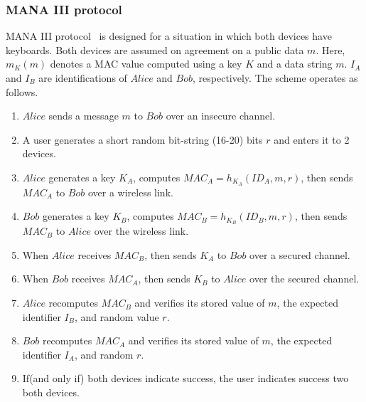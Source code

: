 \subsubsection*{MANA III protocol}

MANA III protocol~\cite{Mitchell:2004p25948} is designed for a situation in which both devices have keyboards. Both devices are assumed on agreement on a public data $m$. Here, $m_K(m)$ denotes a MAC value computed using a key $K$ and a data string $m$. $I_A$ and $I_B$ are identifications of $Alice$ and $Bob$, respectively. The scheme operates as follows. 

\begin{enumerate}
\item $Alice$ sends a message $m$ to $Bob$ over an insecure channel. 
\item A user generates a short random bit-string (16-20) bits $r$ and enters it to 2 devices.
\item $Alice$ generates a key $K_A$, computes $MAC_A = h_{K_A}(ID_A,m,r)$, then sends $MAC_A$ to $Bob$ over a wireless link.
\item $Bob$ generates a key $K_B$, computes $MAC_B = h_{K_B}(ID_B,m,r)$, then sends $MAC_B$ to $Alice$ over the wireless link.
\item When $Alice$ receives $MAC_B$, then sends $K_A$ to $Bob$ over a secured channel.
\item When $Bob$ receives $MAC_A$, then sends $K_B$ to $Alice$ over the secured channel.
\item $Alice$ recomputes $MAC_B$ and verifies its stored value of $m$, the expected identifier $I_B$, and random value $r$.
\item $Bob$ recomputes $MAC_A$ and verifies its stored value of $m$, the expected identifier $I_A$, and random $r$.
\item If(and only if) both devices indicate success, the user indicates success two both devices.
\end{enumerate}


